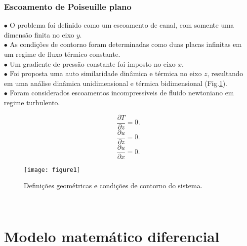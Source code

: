 \documentclass[xcolor=dvipsnames,10pt,aspectratio=169]{beamer}
\begin{document}
		\begin{frame}
			\frametitle{Escoamento de Poiseuille plano}
			$\bullet$ O problema foi definido como um escoamento de canal, com somente uma dimensão finita no eixo $y$. \\
			$\bullet$ As condições de contorno foram determinadas como duas placas infinitas em um regime de fluxo térmico constante.\\
			$\bullet$ Um gradiente de pressão constante foi imposto no eixo $x$.\\
			$\bullet$ Foi proposta uma auto similaridade dinâmica e térmica no eixo $z$, resultando em uma análise dinâmica unidimensional e térmica bidimensional (Fig.\ref{figure.1}). \\
			$\bullet$ Foram considerados escoamentos incompressíveis de fluido newtoniano em regime turbulento.\\
			\begin{minipage}[h!]{0.3\textwidth}
				\begin{equation*}
				 \frac{\partial T }{\partial z} = 0.
				\end{equation*}
				\begin{equation*}
				\frac{\partial u }{\partial z} = 0.
				\end{equation*}
				\begin{equation*}
				\frac{\partial u }{\partial x} = 0.
				\end{equation*}
			\end{minipage}
			\begin{minipage}[h!]{0.5\textwidth}
			\begin{figure}[h!]
				\centering
				\texttt{[image: figure1]}
				\caption{Definições geométricas e condições de contorno do sistema.}
				\label{figure.1}
			\end{figure}
			\end{minipage}
			\\
		\end{frame}
	
	

	
	\section{Modelo matemático diferencial}
	
	
	
	
		
\end{document}
